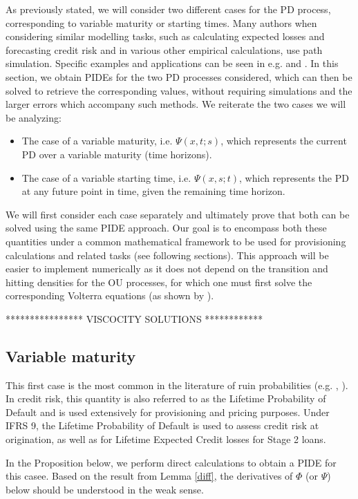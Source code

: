 \documentclass[11pt,reqno]{article}
\theoremstyle{definition}
\begin{document}
As previously stated, we will consider two different cases for the PD process, corresponding to variable maturity or starting times. Many authors when considering similar modelling tasks, such as calculating expected losses and forecasting credit risk and in various other empirical calculations, use path simulation. Specific examples and applications can be seen in e.g. \cite{sak2012fast} and \cite{virolainen2004macro}. In this section, we obtain PIDEs for the two PD processes considered, which can then be solved to retrieve the corresponding values, without requiring simulations and the larger errors which accompany such methods. We reiterate the two cases we will be analyzing:

\begin{itemize}
	\item The case of a variable maturity, i.e. $\Psi(x,t;s)$, which represents the current PD over a variable maturity (time horizons).
	\item The case of a variable starting time, i.e. $\Psi(x,s;t)$, which represents the PD at any future point in time, given the remaining time horizon.
\end{itemize}

We will first consider each case separately and ultimately prove that both can be solved using the same PIDE approach. 
Our goal is to encompass both these quantities under a common mathematical framework to be used for provisioning calculations and related tasks (see following sections). This approach will be easier to implement numerically as it does not depend on the transition and hitting densities for the OU processes, for which one must first solve the corresponding Volterra equations (as shown by \cite{lipton2018first}). 

**************** VISCOCITY SOLUTIONS ************

\subsection{Variable maturity}
This first case is the most common in the literature of ruin probabilities (e.g. \cite{asmussen2010ruin}, \cite{mishura2016ruin}). In credit risk, this quantity is also referred to as the Lifetime Probability of Default and is used extensively for provisioning and pricing purposes. Under IFRS 9, the Lifetime Probability of Default is used to assess credit risk at origination, as well as for Lifetime Expected Credit losses for Stage 2 loans.

\par In the Proposition below, we perform direct calculations to obtain a PIDE for this casee. Based on the result from Lemma \ref{diff}, the derivatives of $\Phi$ (or $\Psi$) below should be understood in the weak sense. 
\end{document}
